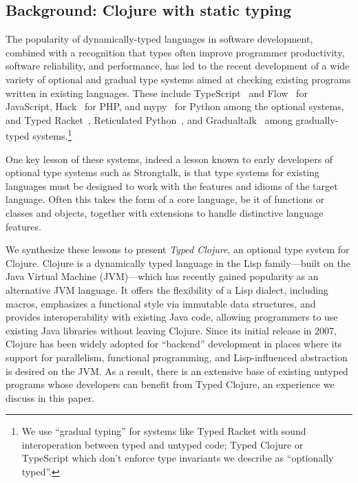 \subsection{Background: Clojure with static typing}


The popularity of dynamically-typed languages in software
development, combined with a recognition that types often improve
programmer productivity, software reliability, and performance, has
led to the recent development of a wide variety of optional and
gradual type systems aimed at checking existing programs written in
existing languages.  These include  TypeScript~\cite{typescript} and Flow~\cite{flow} for
JavaScript, Hack~\cite{hack} for PHP, and mypy~\cite{mypy}
for Python among the optional systems, and Typed Racket~\cite{TF08}, Reticulated
Python~\cite{Vitousek14}, and Gradualtalk~\cite{gradualtalk} among gradually-typed systems.\footnote{We
  use ``gradual typing'' for systems like Typed Racket with sound
  interoperation between typed and untyped code; Typed Clojure or
 TypeScript which don't
  enforce type invariants we describe as ``optionally typed''.}

One key lesson of these systems, indeed a lesson known to early
developers of optional type systems such as Strongtalk, is that type
systems for existing languages must be designed to work with the
features and idioms of the target language. Often this takes the form
of a core language, be it of functions or classes and objects,
together with extensions to handle distinctive language features.


We synthesize these lessons to present \emph{Typed Clojure}, an
optional type system for Clojure. 
%
Clojure is a dynamically
typed language in the Lisp family---built on the Java Virtual
Machine (JVM)---which has recently gained popularity as an alternative
JVM language.  It offers the flexibility of a Lisp dialect, including
macros, emphasizes a functional style via
immutable data structures, and provides
interoperability with existing Java code, allowing programmers to use
existing Java libraries without leaving Clojure.
%
Since its initial release in 2007, Clojure has been widely adopted for
``backend'' development in places where its support for parallelism,
functional programming, and Lisp-influenced abstraction is desired on
the JVM. As a result, there is an extensive base of existing untyped
programs whose developers can benefit from Typed Clojure,
an experience we discuss in this paper.

